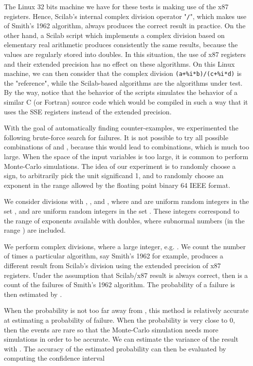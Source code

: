 \documentclass{paper}
\newcommand{\scivar}[1]{\texttt{#1}}
\begin{document}
The Linux 32 bits machine we have for these tests is making use of the x87 registers. 
Hence, Scilab's internal complex division operator "\scivar{/}", 
which makes use of Smith's 1962 algorithm, always produces the correct result in practice.  
On the other hand, a Scilab script which implements a complex division 
based on elementary real arithmetic produces 
consistently the same results, because the values are regularly stored into 
doubles. 
In this situation, the use of x87 registers and their extended precision has 
no effect on these algorithms. 
On this Linux machine, we can then consider that the complex division 
\scivar{(a+\%i*b)/(c+\%i*d)} is the "reference", while the 
Scilab-based algorithms are the algorithms under test. 
By the way, notice that the behavior of the scripts simulates the behavior of a similar 
C (or Fortran) source code which would be compiled in such a way that it uses the 
SSE registers instead of the extended precision.

With the goal of automatically finding counter-examples, we experimented the following 
brute-force search for failures. 
It is not possible to try all possible combinations of  and , because 
this would lead to  combinations, which 
is much too large. 
When the space of the input variables is 
too large, it is common to perform Monte-Carlo simulations. 
The idea of our experiment is to randomly choose a sign, 
to arbitrarily pick the unit significand 1, 
and to randomly choose an exponent in the range allowed by the 
floating point binary 64 IEEE format. 

We consider divisions with , ,  and 
, where  and  are 
uniform random integers in the set , and 
 are uniform random integers in the 
set .
These integers correspond to the range of exponents available 
with doubles, where subnormal numbers (in the range ) 
are included. 

We perform  complex divisions, where  a large integer, e.g. . 
We count the number of times  a particular algorithm, say Smith's 1962 for example, 
produces a different result from Scilab's division using the extended precision of 
x87 registers. 
Under the assumption that Scilab/x87 result is always correct, 
then  is a count of the failures of Smith's 1962 algorithm. 
The probability of a failure  is then estimated by . 

When the probability is not too far away from , this 
method is relatively accurate at estimating a probability of failure. 
When the probability  is very close to 0, then the events are 
rare so that the Monte-Carlo simulation needs more simulations in order 
to be accurate. 
We can estimate the variance of the result with
.
The accuracy of the estimated probability  can then be evaluated 
by computing the confidence interval
\end{document}
